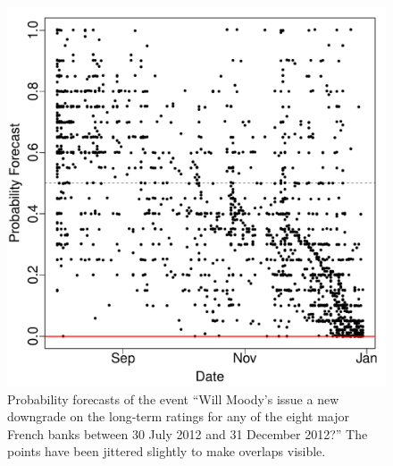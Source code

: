 \documentclass[11pt]{article}
\theoremstyle{definition}
\theoremstyle{definition}
\begin{document}
\begin{figure}[t!]
\captionsetup{width=0.48\textwidth}
\begin{minipage}[t]{.5\textwidth}
                \includegraphics[width=\textwidth]{1127}
                \caption{Probability forecasts of the event ``Will Moody's issue a new downgrade on the long-term ratings for any of the eight major French banks between 30 July 2012 and 31 December 2012?'' The points have been jittered slightly to make overlaps visible.}
                                \label{Example_prob}
\end{minipage}%
\begin{minipage}[t]{.5\textwidth}

\end{minipage}
\end{figure}
\end{document}
